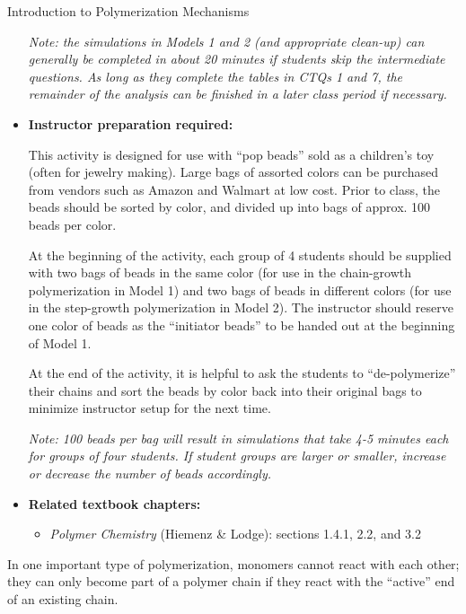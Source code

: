 \begin{activity}{Introduction to Polymerization Mechanisms}
\begin{instructornotes}
\begin{itemize}
			\emph{Note: the simulations in Models 1 and 2 (and appropriate clean-up) can generally be completed in about 20 minutes if students skip the intermediate questions.  As long as they complete the tables in CTQs 1 and 7, the remainder of the analysis can be finished in a later class period if necessary.}
			
		\item \textbf{Instructor preparation required:} 
		
			This activity is designed for use with ``pop beads'' sold as a children's toy (often for jewelry making).  Large bags of assorted colors can be purchased from vendors such as Amazon and Walmart at low cost.  Prior to class, the beads should be sorted by color, and divided up into bags of approx. 100 beads per color.
		
			At the beginning of the activity, each group of 4 students should be supplied with two bags of beads in the same color (for use in the chain-growth polymerization in Model 1) and two bags of beads in different colors (for use in the step-growth polymerization in Model 2).  The instructor should reserve one color of beads as the ``initiator beads'' to be handed out at the beginning of Model 1.
		
			At the end of the activity, it is helpful to ask the students to ``de-polymerize'' their chains and sort the beads by color back into their original bags to minimize instructor setup for the next time.
			
			\emph{Note: 100 beads per bag will result in simulations that take 4-5 minutes each for groups of four students.  If student groups are larger or smaller, increase or decrease the number of beads accordingly.}
		
		\item \textbf{Related textbook chapters:}
			\begin{itemize}
				\item \emph{Polymer Chemistry} (Hiemenz \& Lodge): sections 1.4.1, 2.2, and 3.2
			\end{itemize}
	\end{itemize}

\end{instructornotes}

\newcommand{\timeallowed}{3 minutes}

\begin{model}
\label{\labelbase:mdl:chaingrowth}

	In one important type of polymerization, monomers cannot react with each other; they can only become part of a polymer chain if they react with the ``active'' end of an existing chain.
	

\end{model}
\end{activity}
